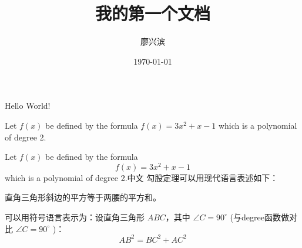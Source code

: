 \documentclass{ctexart}  %
\title{\heiti 我的第一个文档}
\author{\kaishu 廖兴滨}
\date{\today}
\newcommand\degree{^\circ}  %
\begin{document}
	\maketitle  %
	Hello World!
	
	Let  $f(x)$ be defined by the formula $f(x) = 3x^2 + x -1$  which is a polynomial of degree 2.
	
	Let  $f(x)$ be defined by the formula $$f(x) = 3x^2 + x -1$$ which is a polynomial of degree 2.中文
	勾股定理可以用现代语言表述如下：
	
	直角三角形斜边的平方等于两腰的平方和。
	
	可以用符号语言表示为：设直角三角形 $ABC$，其中 $\angle C = 90 \degree$  (与degree函数做对比  $\angle C = 90 ^\circ $ )：
	\begin{equation}  %
		AB^2 = BC^2 + AC ^2
	\end{equation}
\end{document}
